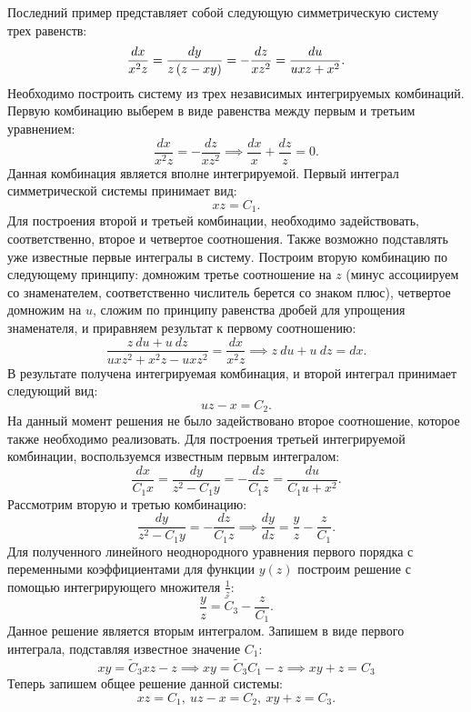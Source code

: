 		Последний пример представляет собой следующую симметрическую систему трех равенств:
		\[ \frac{dx}{x^2 z} = \frac{dy}{z \left( z - xy \right)} = - \frac{dz}{x z^2} = \frac{du}{uxz + x^2}. \] %
		Необходимо построить систему из трех независимых интегрируемых комбинаций. Первую комбинацию выберем в виде равенства между первым и третьим уравнением:
		\[ \frac{dx}{x^2 z} = - \frac{dz}{x z^2} \implies \frac{dx}{x} + \frac{dz}{z} = 0. \]
		Данная комбинация является вполне интегрируемой. Первый интеграл симметрической системы принимает вид:
		\[ xz = C_1. \]
		Для построения второй и третьей комбинации, необходимо задействовать, соответственно, второе и четвертое соотношения. Также возможно подставлять уже известные первые интегралы в систему. Построим вторую комбинацию по следующему принципу: домножим третье соотношение на $z$ (минус ассоциируем со знаменателем, соответственно числитель берется со знаком плюс), четвертое домножим на $u$, сложим по принципу равенства дробей для упрощения знаменателя, и приравняем результат к первому соотношению:
		\[ \frac{z ~ du + u ~ dz}{uxz^2 + x^2 z - uxz^2} = \frac{dx}{x^2 z} \implies z ~ du + u ~ dz = dx. \]
		В результате получена интегрируемая комбинация, и второй интеграл принимает следующий вид:
		\[ uz - x = C_2. \]
		На данный момент решения не было задействовано второе соотношение, которое также необходимо реализовать. Для построения третьей интегрируемой комбинации, воспользуемся известным первым интегралом:
		\[ \frac{dx}{C_1 x} = \frac{dy}{z^2 - C_1 y} = - \frac{dz}{C_1 z} = \frac{du}{C_1 u + x^2}. \] %
		Рассмотрим вторую и третью комбинацию:
		\[ \frac{dy}{z^2 - C_1 y} = - \frac{dz}{C_1 z} \implies \frac{dy}{dz} = \frac{y}{z} - \frac{z}{C_1}. \]
		Для полученного линейного неоднородного уравнения первого порядка с переменными коэффициентами для функции $y(z)$ построим решение с помощью интегрирующего множителя $\frac{1}{z}$:
		\[ \frac{y}{z} = \tilde{C}_3 - \frac{z}{C_1}. \]
		Данное решение является вторым интегралом. Запишем в виде первого интеграла, подставляя известное значение $C_1$:
		\[ xy = \tilde{C}_3 xz - z \implies xy = \tilde{C}_3 C_1 - z \implies xy + z = C_3 \]
		Теперь запишем общее решение данной системы:
		\[ xz = C_1, ~ uz - x = C_2, ~ xy + z = C_3. \]

	

